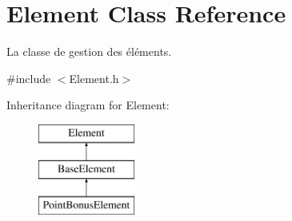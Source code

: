 \hypertarget{classElement}{\section{Element Class Reference}
\label{classElement}
}


La classe de gestion des éléments.  




{\ttfamily \#include $<$Element.\-h$>$}

Inheritance diagram for Element\-:\begin{figure}[H]
\begin{center}
\leavevmode
\includegraphics[height=3.000000cm]{classElement}
\end{center}
\end{figure}
